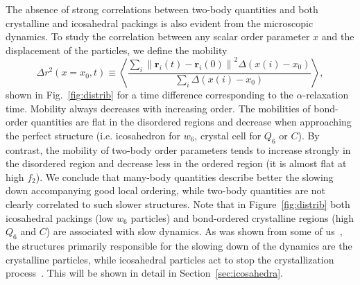 \documentclass[twocolumn,superscriptaddress]{revtex4}
\begin{document}
The absence of strong correlations between two-body quantities and both crystalline and icosahedral packings is also evident from
the microscopic dynamics.
To study the correlation between any scalar order parameter $x$ and the displacement of the particles, we define the mobility 
\begin{equation}
	\Delta r^2(x=x_0, t) \equiv \left\langle \frac{
		\sum\limits_i{
			\left\|\mathbf{r}_i(t)-\mathbf{r}_i(0)\right\|^2 \Delta(x(i)-x_0)
			}
	}{
		\sum\limits_i{\Delta(x(i)-x_0)}
	}\right\rangle,
	\label{eq:mobility}
\end{equation}
shown in Fig.~\ref{fig:distrib} for a time difference corresponding to the $\alpha$-relaxation time. Mobility always decreases with increasing order. The mobilities of bond-order quantities are flat in the disordered regions and decrease when approaching the perfect structure (i.e. icosahedron for $w_6$, crystal cell for $Q_6$ or $C$). By contrast, the mobility of two-body order parameters tends to increase strongly in the disordered region and decrease less in the ordered region (it is almost flat at high $f_2$). We conclude that many-body quantities describe better the slowing down accompanying good local ordering, while two-body quantities are not clearly correlated to such slower structures.
Note that in Figure~\ref{fig:distrib} both icosahedral packings (low $w_6$ particles) and bond-ordered crystalline regions (high $Q_6$ and $C$) are associated with slow dynamics. As was shown from some of us~\cite{mathieu_icosahedra}, the structures primarily responsible for the slowing down of the dynamics are the crystalline particles, while icosahedral particles act to stop the crystallization process~\cite{russo_hs}.
This will be shown in detail in Section~\ref{sec:icosahedra}.
\end{document}
